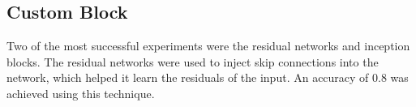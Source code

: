 \documentclass[11pt]{article}
\begin{document}
\begin{multicols}{2}



      \section{Custom Block}

      Two of the most successful experiments were the residual networks and
      inception blocks. The residual networks were used to inject skip
      connections into the network, which helped it learn the residuals of the
      input. An accuracy of 0.8 was achieved using this technique.


\end{multicols}
\end{document}
